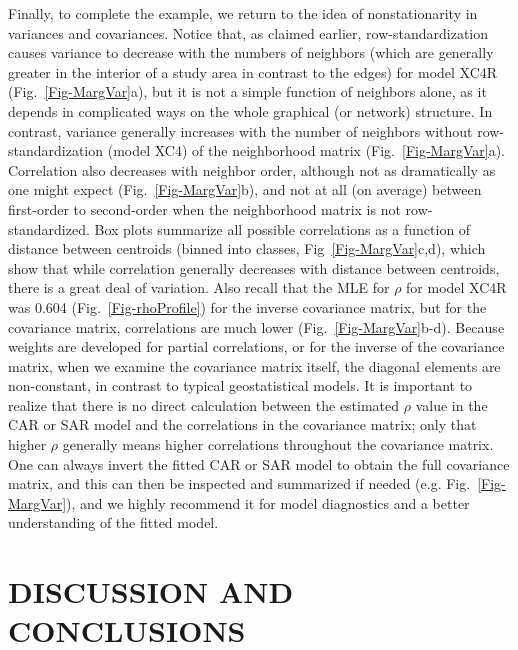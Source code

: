 \documentclass[11pt, titlepage]{article}\usepackage[]{graphicx}\usepackage[]{color}
\begin{document}
Finally, to complete the example, we return to the idea of nonstationarity in variances and covariances.  Notice that, as claimed earlier, row-standardization causes variance to decrease with the numbers of neighbors (which are generally greater in the interior of a study area in contrast to the edges) for model XC4R (Fig.~\ref{Fig-MargVar}a), but it is not a simple function of neighbors alone, as it depends in complicated ways on the whole graphical (or network) structure.  In contrast, variance generally increases with the number of neighbors without row-standardization (model XC4) of the neighborhood matrix (Fig.~\ref{Fig-MargVar}a). Correlation also decreases with neighbor order, although not as dramatically as one might expect (Fig.~\ref{Fig-MargVar}b), and not at all (on average) between first-order to second-order when the neighborhood matrix is not row-standardized. Box plots summarize all possible correlations as a function of distance between centroids (binned into classes, Fig~\ref{Fig-MargVar}c,d), which show that while correlation generally decreases with distance between centroids, there is a great deal of variation. Also recall that the MLE for $\rho$ for model XC4R was 0.604 (Fig.~\ref{Fig-rhoProfile}) for the inverse covariance matrix, but for the covariance matrix, correlations are much lower (Fig.~\ref{Fig-MargVar}b-d). Because weights are developed for partial correlations, or for the inverse of the covariance matrix, when we examine the covariance matrix itself, the diagonal elements are non-constant, in contrast to typical geostatistical models. It is important to realize that there is no direct calculation between the estimated $\rho$ value in the CAR or SAR model and the correlations in the covariance matrix; only that higher $\rho$ generally means higher correlations throughout the covariance matrix. One can always invert the fitted CAR or SAR model to obtain the full covariance matrix, and this can then be inspected and summarized if needed (e.g. Fig.~\ref{Fig-MargVar}), and we highly recommend it for model diagnostics and a better understanding of the fitted model.

\section*{DISCUSSION AND CONCLUSIONS}
\end{document}
